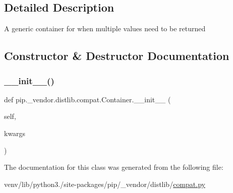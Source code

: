 \subsection{Detailed Description}
\begin{DoxyVerb}A generic container for when multiple values need to be returned
\end{DoxyVerb}
 

\subsection{Constructor \& Destructor Documentation}
\mbox{\label{classpip_1_1__vendor_1_1distlib_1_1compat_1_1Container_a2ecf16bce9b7045854c257ab2ca753f9}} 
\subsubsection{\texorpdfstring{\+\_\+\+\_\+init\+\_\+\+\_\+()}{\_\_init\_\_()}}
{\footnotesize\ttfamily def pip.\+\_\+vendor.\+distlib.\+compat.\+Container.\+\_\+\+\_\+init\+\_\+\+\_\+ (\begin{DoxyParamCaption}\item[{}]{self,  }\item[{}]{kwargs }\end{DoxyParamCaption})}



The documentation for this class was generated from the following file\+:\begin{DoxyCompactItemize}
\item 
venv/lib/python3./site-\/packages/pip/\+\_\+vendor/distlib/\hyperlink{__vendor_2distlib_2compat_8py}{compat.\+py}\end{DoxyCompactItemize}
